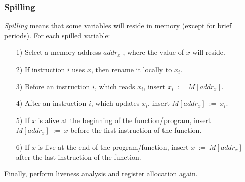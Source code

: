 \documentclass{beamer}
\renewcommand{\emph}[1]{\textcolor{structure}{#1}}
\newcommand{\emp}[1]{\textcolor{DikuRed}{ #1}}
\begin{document}
\begin{frame}
\frametitle{Spilling}

\emph{\em Spilling} means that some variables will reside in memory (except for
brief periods). \emp{For each spilled variable:}\smallskip


\begin{itemize}

\item[1)] Select a memory address $addr_x$ , where the value of $x$ will reside.\smallskip

\item[2)] If instruction $i$ uses $x$, then rename it locally to $x_i$.\smallskip

\item[3)] Before an instruction $i$, which reads $x_i$, insert $x_i~:=~M[addr_x]$.\smallskip

\item[4)] After an instruction $i$, which updates $x_i$, insert  $M[addr_x]~:=~x_i$.\smallskip

\item[5)] If $x$ is alive at the beginning of the function/program, insert
            $M[addr_x]~:=~x$ before the first instruction of the function.\smallskip

\item[6)] If $x$ is live at the end of the program/function, insert
            $x~:=~M[addr_x]$ after the last instruction of the function.

\end{itemize}

\bigskip

\emp{Finally, perform liveness analysis and register allocation again.}

\end{frame}
\end{document}
